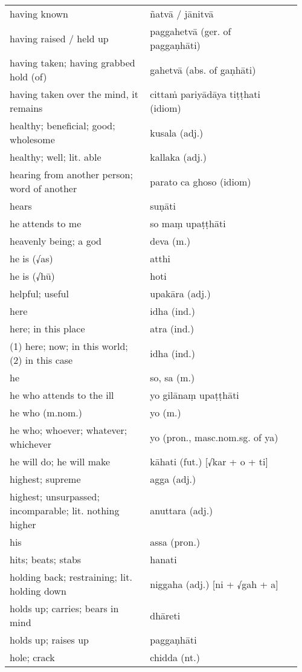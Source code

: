 \documentclass[a5paper]{memoir}
\begin{document}
\begin{longtable}{L{0.48\linewidth} L{0.48\linewidth} H}
having known & ñatvā / jānitvā & \\[0pt]
having raised / held up & paggahetvā (ger. of paggaṇhāti) & \\[0pt]
having taken; having grabbed hold (of) & gahetvā (abs. of gaṇhāti) & \\[0pt]
having taken over the mind, it remains & cittaṁ pariyādāya tiṭṭhati (idiom) & \\[0pt]
healthy; beneficial; good; wholesome & kusala (adj.) & \\[0pt]
healthy; well; lit. able & kallaka (adj.) & \\[0pt]
hearing from another person; word of another & parato ca ghoso (idiom) & \\[0pt]
hears & suṇāti & \\[0pt]
he attends to me & so maṃ upaṭṭhāti & \\[0pt]
heavenly being; a god & deva (m.) & \\[0pt]
he is (√as) & atthi & \\[0pt]
he is (√hū) & hoti & \\[0pt]
helpful; useful & upakāra (adj.) & \\[0pt]
here & idha (ind.) & \\[0pt]
here; in this place & atra (ind.) & \\[0pt]
(1) here; now; in this world; (2) in this case & idha (ind.) & \\[0pt]
he & so, sa (m.) & \\[0pt]
he who attends to the ill & yo gilānaṃ upaṭṭhāti & \\[0pt]
he who (m.nom.) & yo (m.) & \\[0pt]
he who; whoever; whatever; whichever & yo (pron., masc.nom.sg. of ya) & \\[0pt]
he will do; he will make & kāhati (fut.) [√kar + o + ti] & \\[0pt]
highest; supreme & agga (adj.) & \\[0pt]
highest; unsurpassed; incomparable; lit. nothing higher & anuttara (adj.) & \\[0pt]
his & assa (pron.) & \\[0pt]
hits; beats; stabs & hanati & \\[0pt]
holding back; restraining; lit. holding down & niggaha (adj.) [ni + √gah + a] & \\[0pt]
holds up; carries; bears in mind & dhāreti & \\[0pt]
holds up; raises up & paggaṇhāti & \\[0pt]
hole; crack & chidda (nt.) & \\[0pt]

\end{longtable}
\end{document}
